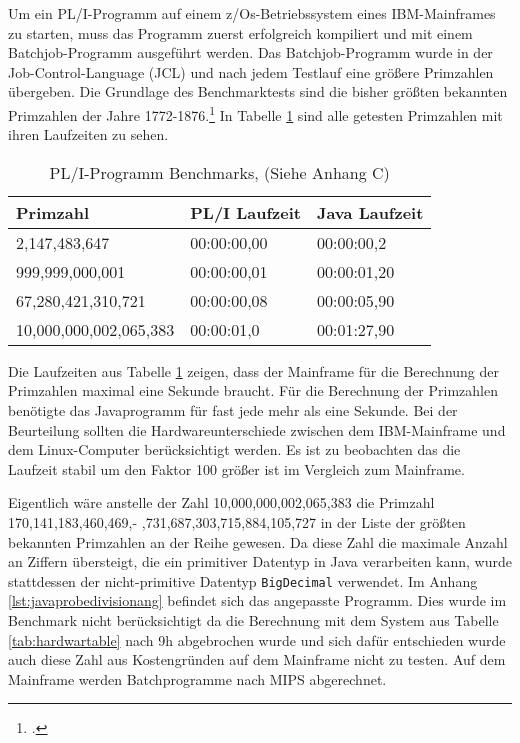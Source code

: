 Um ein PL/I-Programm auf einem z/Os-Betriebssystem eines IBM-Mainframes zu starten, muss das Programm zuerst erfolgreich kompiliert und mit einem Batchjob-Programm ausgeführt werden. Das Batchjob-Programm wurde in der Job-Control-Language (JCL) und nach jedem Testlauf eine größere Primzahlen übergeben.
Die Grundlage des Benchmarktests sind die bisher größten bekannten Primzahlen der Jahre 1772-1876.\footcite[Vgl. ][]{prime} In Tabelle \ref{tab:plibenchmark} sind alle getesten Primzahlen mit ihren Laufzeiten zu sehen. 

\begin{table}[h]
	\centering
	\begin{tabularx}{\textwidth}{|X|X|X|}
		\hline
		\textbf{Primzahl} & \textbf{PL/I Laufzeit} & \textbf{Java Laufzeit} \\
		\hline
		2,147,483,647 & 00:00:00,00 & 00:00:00,2 \\
		
		999,999,000,001 & 00:00:00,01 & 00:00:01,20\\
		
		67,280,421,310,721 & 00:00:00,08 & 00:00:05,90 \\
		
		10,000,000,002,065,383 & 00:00:01,0 & 00:01:27,90 \\
		\hline
	\end{tabularx}
	\caption{PL/I-Programm Benchmarks, (Siehe Anhang C) \label{tab:plibenchmark}}
\end{table}


Die Laufzeiten aus Tabelle \ref{tab:plibenchmark} zeigen, dass der Mainframe für die Berechnung der Primzahlen maximal eine Sekunde braucht. Für die Berechnung der Primzahlen benötigte das Javaprogramm für fast jede mehr als eine Sekunde. Bei der Beurteilung sollten die Hardwareunterschiede zwischen dem IBM-Mainframe und dem Linux-Computer berücksichtigt werden. Es ist zu beobachten das die Laufzeit stabil um den Faktor 100 größer ist im Vergleich zum Mainframe.

Eigentlich wäre anstelle der Zahl 10,000,000,002,065,383 die Primzahl 170,141,183,460,469,- ,731,687,303,715,884,105,727 in der Liste der größten bekannten Primzahlen an der Reihe gewesen. 
Da diese Zahl die maximale Anzahl an Ziffern übersteigt, die ein primitiver Datentyp in Java verarbeiten kann, wurde stattdessen der nicht-primitive Datentyp \verb+BigDecimal+ verwendet. Im Anhang \ref{lst:javaprobedivisionang} befindet sich das angepasste Programm. 
Dies wurde im Benchmark nicht berücksichtigt da die Berechnung mit dem System aus Tabelle \ref{tab:hardwartable} nach 9h abgebrochen wurde und sich dafür entschieden wurde auch diese Zahl aus Kostengründen auf dem Mainframe nicht zu testen. Auf dem Mainframe werden Batchprogramme nach \ac{MIPS} abgerechnet.

